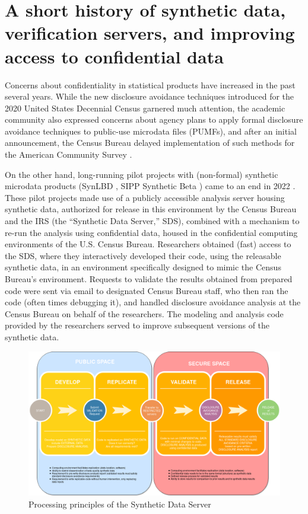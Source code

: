 \documentclass[]{hdsr}
\begin{document}
\section{A short history of synthetic data, verification servers, and improving access to confidential data}
\label{sec1}
\label{intro}

Concerns about confidentiality in statistical products have increased in the past several years. While the new disclosure avoidance techniques introduced for the 2020 United States Decennial Census \citep{abowd_2020_2022} garnered much attention, the academic community also expressed concerns about agency plans to apply formal disclosure avoidance techniques to public-use microdata files (PUMFs), and after an initial announcement, the Census Bureau delayed implementation of such methods for the American Community Survey \citep{daily_disclosure_2022}.

On the other hand, long-running pilot projects with (non-formal) synthetic microdata products (SynLBD \citep{KinneyEtAl2011}, SIPP Synthetic Beta \citep{Benedettoetal_2013}) came to an end in 2022 \citep{vilhuber_end_2022}. These pilot projects made use of a publicly accessible analysis server housing synthetic data, authorized for release in this environment by the Census Bureau and the IRS (the ``Synthetic Data Server,'' SDS), combined with a mechanism to re-run the analysis using confidential data, housed in the confidential computing environments of the U.S. Census Bureau. Researchers obtained (fast) access to the SDS, where they interactively developed their code, using the releasable synthetic data, in an environment specifically designed to mimic the Census Bureau's environment. Requests to validate the results obtained from prepared code were sent via email to designated Census Bureau staff, who then ran the code (often times debugging it), and handled disclosure avoidance analysis at the Census Bureau on behalf of the researchers. The modeling and analysis code provided by the researchers served to improve subsequent versions of the synthetic data. 

\begin{figure}
    \centering
    \includegraphics[width=\textwidth]{figs/SyntheticDataCycle.png}
    \caption{Processing principles of the Synthetic Data Server}
    \label{fig:data-cycle.png}
\end{figure}
\end{document}
